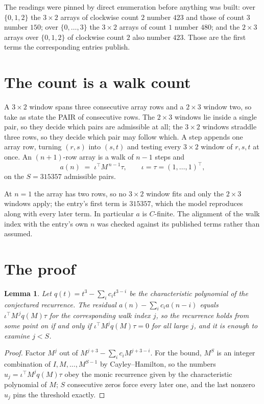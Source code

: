 \documentclass[11pt,a4paper]{article}
\theoremstyle{plain}
\newtheorem{lemma}[theorem]{Lemma}
\theoremstyle{definition}
\begin{document}
The readings were pinned by direct enumeration before anything was built: over
$\{0,1,2\}$ the $3\times2$ arrays of clockwise count $2$ number $423$ and those of count
$3$ number $150$; over $\{0,\dots,3\}$ the $3\times2$ arrays of count $1$ number $480$;
and the $2\times3$ arrays over $\{0,1,2\}$ of clockwise count $2$ also number $423$. Those
are the first terms the corresponding entries publish.

\section{The count is a walk count}

A $3\times2$ window spans three consecutive array rows and a $2\times3$
window two, so take as state the PAIR of consecutive rows. The $2\times3$ windows lie inside a
single pair, so they decide which pairs are admissible at all; the $3\times2$ windows straddle
three rows, so they decide which pair may follow which. A step appends one array row, turning
$(r,s)$ into $(s,t)$ and testing every $3\times2$ window of $r,s,t$ at once. An $(n+1)$-row
array is a walk of $n-1$ steps and
\[
a(n)\;=\;\iota^{\!\top}M^{\,n-1}\tau,\qquad\iota=\tau=(1,\dots,1)^{\!\top},
\]
on the $S=315357$ admissible pairs.

At $n=1$ the array has two rows, so no $3\times2$ window fits and only the
$2\times3$ windows apply; the entry's first term is
$315357$, which the model reproduces along with every later term.
In particular $a$ is $C$-finite. The alignment of the walk index with the entry's own $n$ was
checked against its published terms rather than assumed.

\section{The proof}

\begin{lemma}\label{lem:crit}
Let $q(t)=t^{3}-\sum_i c_it^{3-i}$ be the characteristic polynomial of the
conjectured recurrence. The residual $a(n)-\sum_ic_ia(n-i)$ equals
$\iota^{\!\top}M^{\,j}q(M)\tau$ for the corresponding walk index $j$, so the recurrence
holds from some point on if and only if $\iota^{\!\top}M^{j}q(M)\tau=0$ for all large $j$,
and it is enough to examine $j<S$.
\end{lemma}

\begin{proof}
Factor $M^{j}$ out of $M^{j+3}-\sum_ic_iM^{j+3-i}$. For the bound, $M^{S}$
is an integer combination of $I,M,\dots,M^{S-1}$ by Cayley--Hamilton, so the numbers
$u_j=\iota^{\!\top}M^{j}q(M)\tau$ obey the monic recurrence given by the characteristic
polynomial of $M$; $S$ consecutive zeros force every later one, and the last nonzero $u_j$
pins the threshold exactly.
\end{proof}
\end{document}
